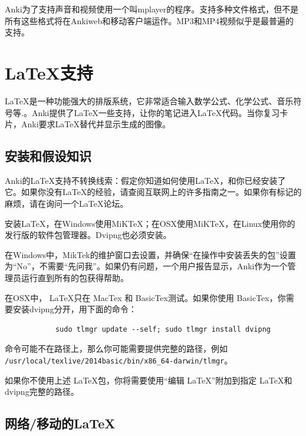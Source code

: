 \documentclass[a4paper]{book}
\begin{document}
		Anki为了支持声音和视频使用一个叫mplayer的程序。支持多种文件格式，但不是所有这些格式将在Ankiweb和移动客户端运作。MP3和MP4视频似乎是最普遍的支持。
		
		\chapter{LaTeX支持}
		
		LaTeX是一种功能强大的排版系统，它非常适合输入数学公式、化学公式、音乐符号等.。Anki提供了LaTeX一些支持，让你的笔记进入LaTeX代码。当你复习卡片，Anki要求LaTeX替代并显示生成的图像。
		
		\section{安装和假设知识}
		
		Anki的LaTeX支持不转换线索：假定你知道如何使用LaTeX，和你已经安装了它。如果你没有LaTeX的经验，请查阅互联网上的许多指南之一。如果你有标记的麻烦，请在询问一个LaTeX论坛。
		
		安装LaTeX，在Windows使用MiKTeX；在OSX使用MiKTeX，在Linux使用你的发行版的软件包管理器。Dvipng也必须安装。
		
		
		\begin{shaded}
			在Windows中，MikTek的维护窗口去设置，并确保“在操作中安装丢失的包”设置为“No”，不需要“先问我”。如果仍有问题，一个用户报告显示，Anki作为一个管理员运行直到所有的包获得帮助。
		\end{shaded}
		
		\begin{shaded}
			在OSX中， LaTeX只在 MacTex 和 BasicTex测试。如果你使用 BasicTex，你需要安装dvipng分开，用下面的命令：
		\end{shaded}
		
		\begin{shaded}\begin{verbatim}
			sudo tlmgr update --self; sudo tlmgr install dvipng
			\end{verbatim}\end{shaded}
		命令可能不在路径上，那么你可能需要提供完整的路径，例如 \verb|/usr/local/texlive/2014basic/bin/x86_64-darwin/tlmgr|。
		
		
		\begin{shaded}
			如果你不使用上述 \LaTeX 包，你将需要使用“编辑 \LaTeX”附加到指定 \LaTeX 和dvipng完整的路径。
		\end{shaded}
		
		\section{网络/移动的LaTeX}
		
\end{document}
